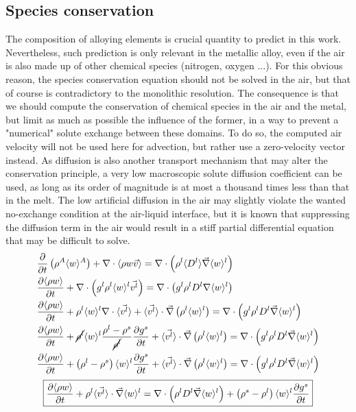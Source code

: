 \subsection{Species conservation}
%
The composition of alloying elements is crucial quantity to predict in this work. Nevertheless, such prediction is only relevant
in the metallic alloy, even if the air is also made up of other chemical species (nitrogen, oxygen ...). For this obvious reason,
the species conservation equation should not be solved in the air, but that of course is contradictory to the monolithic resolution.
The consequence is that we should compute the conservation of chemical species in the air and the metal, but limit as much as possible
the influence of the former, in a way to prevent a "numerical" solute exchange between these domains. To do so, the computed air velocity
will not be used here for advection, but rather use a zero-velocity vector instead. 
As diffusion is also another transport mechanism that may alter the conservation principle, a very low macroscopic solute diffusion 
coefficient can be used, as long as its order of magnitude is at most a thousand times less than that in the melt.
The low artificial diffusion in the air may slightly violate the wanted no-exchange condition at the air-liquid interface, but it is 
known that suppressing the diffusion term in the air would result in a stiff partial differential equation that may be difficult to solve.
\begin{subequations}
\begin{align}
	& \frac{\partial}{\partial t} \left( \rho^A \langle w \rangle^A \right) + \nabla \cdot \langle \rho w \vec{v} \rangle 
	= \nabla  \cdot \left( \rho^l \langle D^l \rangle \vec{\nabla} \langle w \rangle^l  \right) \\
	& \frac{\partial \langle \rho w \rangle}{\partial t} + \nabla \cdot \left( {g^l} \rho^l \langle w \rangle^l \vec{v^l} \right)
	= \nabla  \cdot \left( {g^l}\rho^l D^l \nabla \langle w \rangle^l  \right) \\ 
	& \frac{\partial \langle \rho w \rangle}{\partial t} 
		+ \rho^l \langle w \rangle^l  \nabla \cdot \langle \vec{v^l} \rangle
		+ \langle \vec{v^l} \rangle \cdot \vec{\nabla} \left( \rho^l \langle w \rangle^l \right)
		= \nabla  \cdot \left( {g^l} \rho^l D^l \vec{\nabla} \langle w \rangle^l  \right) \\   
	& \frac{\partial \langle \rho w \rangle}{\partial t} 
		+ \cancel{\rho^l} \langle w \rangle^l  \frac{\rho^l-\rho^s}{\cancel{\rho^l}} \frac{\partial  {g^s} }{\partial t}
		+ \langle \vec{v^l} \rangle \cdot \vec{\nabla} \left( \rho^l \langle w \rangle^l \right)
		= \nabla  \cdot \left( {g^l} \rho^l D^l \vec{\nabla} \langle w \rangle^l  \right) \\ 
	& \frac{\partial \langle \rho w \rangle}{\partial t} 
		+ \left( \rho^l-\rho^s \right) \langle w \rangle^l \frac{\partial  {g^s} }{\partial t}
		+ \langle \vec{v^l} \rangle \cdot \vec{\nabla} \left( \rho^l \langle w \rangle^l \right)
		= \nabla  \cdot \left( {g^l} \rho^l D^l \vec{\nabla} \langle w \rangle^l  \right)        
\end{align}
\end{subequations}
\begin{align}
\label{eq:solute_balance_air}
 \boxed{ \frac{\partial \langle \rho w \rangle}{\partial t} 
		+ \rho^l \langle \vec{v^l} \rangle \cdot \vec{\nabla} \langle w \rangle^l
		= \nabla  \cdot \left( \rho^l D^l \vec{\nabla} \langle w \rangle^l  \right)
		+ \left( \rho^s-\rho^l \right) \langle w \rangle^l \frac{\partial  {g^s}}{\partial t}}
\end{align}
%

